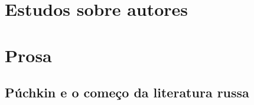 















\part{Estudos sobre autores}

\part{Prosa}

\chapter{Púchkin e o começo da literatura russa}


